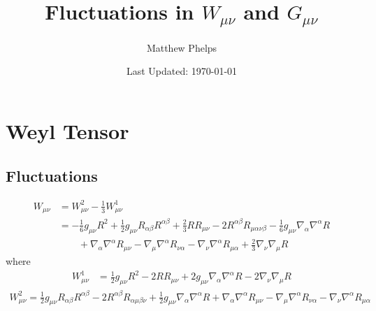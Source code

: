 \documentclass[10pt,letterpaper]{article}
\title{Fluctuations in  $W_{\mu\nu}$ and $G_{\mu\nu}$}
\author{Matthew Phelps}
\date{Last Updated: \today}
\numberwithin{equation}{section}
\begin{document}
\maketitle
\newpage
\tableofcontents
\newpage
\section{Weyl Tensor}
\subsection{Fluctuations}
\begin{align}
	W_{\mu\nu} &= W^2_{\mu\nu} - \frac13 W^1_{\mu\nu}\\
	&= - \tfrac{1}{6} g_{\mu \nu} R^2 + \tfrac{1}{2} g_{\mu \nu} R_{\alpha \beta} R^{\alpha \beta} + \tfrac{2}{3} R R_{\mu \nu} - 2 R^{\alpha \beta} R_{\mu \alpha \nu \beta} -  \tfrac{1}{6} g_{\mu \nu} \nabla_{\alpha}\nabla^{\alpha}R \nonumber \\
&\qquad + \nabla_{\alpha}\nabla^{\alpha}R_{\mu \nu} -  \nabla_{\mu}\nabla^{\alpha}R_{\nu \alpha} -  \nabla_{\nu}\nabla^{\alpha}R_{\mu \alpha} + \tfrac{2}{3} \nabla_{\nu}\nabla_{\mu}R \nonumber
\end{align}
where 
\begin{align}
	W^1_{\mu\nu} &= \tfrac{1}{2} g_{\mu \nu} R^2 - 2 R R_{\mu \nu} + 2 g_{\mu \nu} \nabla_{\alpha}\nabla^{\alpha}R - 2 \nabla_{\nu}\nabla_{\mu}R
\end{align}
\begin{align}
	W^2_{\mu\nu} = \tfrac{1}{2} g_{\mu \nu} R_{\alpha \beta} R^{\alpha \beta} - 2 R^{\alpha \beta} R_{\alpha \mu \beta \nu} + \tfrac{1}{2} g_{\mu \nu} \nabla_{\alpha}\nabla^{\alpha}R + \nabla_{\alpha}\nabla^{\alpha}R_{\mu \nu} -  \nabla_{\mu}\nabla^{\alpha}R_{\nu \alpha} -  \nabla_{\nu}\nabla^{\alpha}R_{\mu \alpha}
\end{align}
\end{document}
